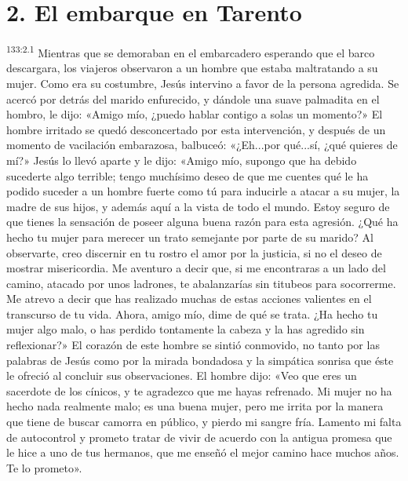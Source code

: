 \section*{2. El embarque en Tarento}
\par
\textsuperscript{133:2.1} Mientras que se demoraban en el embarcadero esperando que el barco descargara, los viajeros observaron a un hombre que estaba maltratando a su mujer. Como era su costumbre, Jesús intervino a favor de la persona agredida. Se acercó por detrás del marido enfurecido, y dándole una suave palmadita en el hombro, le dijo: «Amigo mío, ¿puedo hablar contigo a solas un momento?» El hombre irritado se quedó desconcertado por esta intervención, y después de un momento de vacilación embarazosa, balbuceó: «¿Eh...por qué...sí, ¿qué quieres de mí?» Jesús lo llevó aparte y le dijo: «Amigo mío, supongo que ha debido sucederte algo terrible; tengo muchísimo deseo de que me cuentes qué le ha podido suceder a un hombre fuerte como tú para inducirle a atacar a su mujer, la madre de sus hijos, y además aquí a la vista de todo el mundo. Estoy seguro de que tienes la sensación de poseer alguna buena razón para esta agresión. ¿Qué ha hecho tu mujer para merecer un trato semejante por parte de su marido? Al observarte, creo discernir en tu rostro el amor por la justicia, si no el deseo de mostrar misericordia. Me aventuro a decir que, si me encontraras a un lado del camino, atacado por unos ladrones, te abalanzarías sin titubeos para socorrerme. Me atrevo a decir que has realizado muchas de estas acciones valientes en el transcurso de tu vida. Ahora, amigo mío, dime de qué se trata. ¿Ha hecho tu mujer algo malo, o has perdido tontamente la cabeza y la has agredido sin reflexionar?» El corazón de este hombre se sintió conmovido, no tanto por las palabras de Jesús como por la mirada bondadosa y la simpática sonrisa que éste le ofreció al concluir sus observaciones. El hombre dijo: «Veo que eres un sacerdote de los cínicos, y te agradezco que me hayas refrenado. Mi mujer no ha hecho nada realmente malo; es una buena mujer, pero me irrita por la manera que tiene de buscar camorra en público, y pierdo mi sangre fría. Lamento mi falta de autocontrol y prometo tratar de vivir de acuerdo con la antigua promesa que le hice a uno de tus hermanos, que me enseñó el mejor camino hace muchos años. Te lo prometo».

